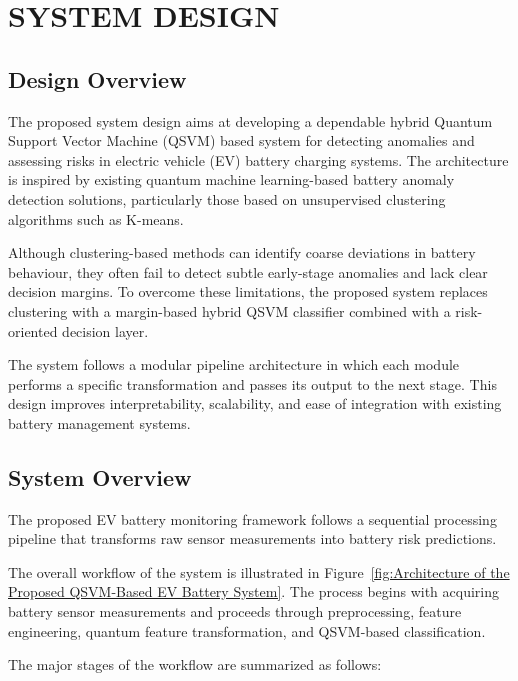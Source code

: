 \chapter{SYSTEM DESIGN}

\section{Design Overview}

The proposed system design aims at developing a dependable hybrid Quantum Support Vector Machine (QSVM) based system for detecting anomalies and assessing risks in electric vehicle (EV) battery charging systems. The architecture is inspired by existing quantum machine learning-based battery anomaly detection solutions, particularly those based on unsupervised clustering algorithms such as K-means.

Although clustering-based methods can identify coarse deviations in battery behaviour, they often fail to detect subtle early-stage anomalies and lack clear decision margins. To overcome these limitations, the proposed system replaces clustering with a margin-based hybrid QSVM classifier combined with a risk-oriented decision layer.

The system follows a modular pipeline architecture in which each module performs a specific transformation and passes its output to the next stage. This design improves interpretability, scalability, and ease of integration with existing battery management systems.

\section{System Overview}

The proposed EV battery monitoring framework follows a sequential processing pipeline that transforms raw sensor measurements into battery risk predictions.

The overall workflow of the system is illustrated in Figure~\ref{fig:Architecture of the Proposed QSVM-Based EV Battery System}. The process begins with acquiring battery sensor measurements and proceeds through preprocessing, feature engineering, quantum feature transformation, and QSVM-based classification.

The major stages of the workflow are summarized as follows:

